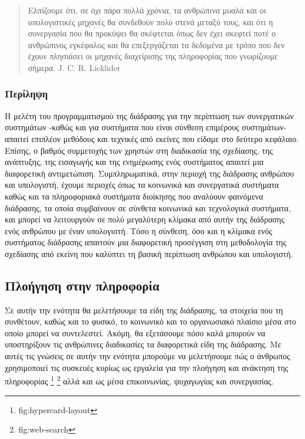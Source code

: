 \documentclass[
]{article}
\begin{document}
\begin{quote}
Ελπίζουμε ότι, σε όχι πάρα πολλά χρόνια, τα ανθρώπινα μυαλά και οι
υπολογιστικές μηχανές θα συνδεθούν πολύ στενά μεταξύ τους, και ότι η
συνεργασία που θα προκύψει θα σκέφτεται όπως δεν έχει σκεφτεί ποτέ ο
ανθρώπινος εγκέφαλος και θα επεξεργάζεται τα δεδομένα με τρόπο που δεν
έχουν πλησιάσει οι μηχανές διαχείρισης της πληροφορίας που γνωρίζουμε
σήμερα. J. C. R. Licklider
\end{quote}

\hypertarget{ux3c0ux3b5ux3c1ux3afux3bbux3b7ux3c8ux3b7}{%
\subsubsection{Περίληψη}\label{ux3c0ux3b5ux3c1ux3afux3bbux3b7ux3c8ux3b7}}

Η μελέτη του προγραμματισμού της διάδρασης για την περίπτωση των
συνεργατικών συστημάτων -καθώς και για συστήματα που είναι σύνθεση
επιμέρους συστημάτων- απαιτεί επιπλέον μεθόδους και τεχνικές από εκείνες
που είδαμε στο δεύτερο κεφάλαιο. Επίσης, ο βαθμός συμμετοχής των χρηστών
στη διαδικασία της σχεδίασης, της ανάπτυξης, της εισαγωγής και της
ενημέρωσης ενός συστήματος απαιτεί μια διαφορετική αντιμετώπιση.
Συμπληρωματικά, στην περιοχή της διάδρασης ανθρώπου και υπολογιστή,
έχουμε περιοχές όπως τα κοινωνικά και συνεργατικά συστήματα καθώς και τα
πληροφοριακά συστήματα διοίκησης που αναλύουν φαινόμενα διάδρασης, τα
οποία συμβαίνουν σε σύνθετα κοινωνικά και τεχνολογικά συστήματα, και
μπορεί να λειτουργούν σε πολύ μεγαλύτερη κλίμακα από αυτήν της διάδρασης
ενός ανθρώπου με έναν υπολογιστή. Τόσο η σύνθεση, όσο και η κλίμακα ενός
συστήματος διάδρασης απαιτούν μια διαφορετική προσέγγιση στη μεθοδολογία
της σχεδίασης από εκείνη που καλύπτει τη βασική περίπτωση ανθρώπου και
υπολογιστή.

\hypertarget{ux3c0ux3bbux3bfux3aeux3b3ux3b7ux3c3ux3b7-ux3c3ux3c4ux3b7ux3bd-ux3c0ux3bbux3b7ux3c1ux3bfux3c6ux3bfux3c1ux3afux3b1}{%
\subsection{Πλοήγηση στην
πληροφορία}\label{ux3c0ux3bbux3bfux3aeux3b3ux3b7ux3c3ux3b7-ux3c3ux3c4ux3b7ux3bd-ux3c0ux3bbux3b7ux3c1ux3bfux3c6ux3bfux3c1ux3afux3b1}}

Σε αυτήν την ενότητα θα μελετήσουμε τα είδη της διάδρασης, τα στοιχεία
που τη συνθέτουν, καθώς και το φυσικό, το κοινωνικό και το οργανωσιακό
πλαίσιο μέσα στο οποίο μπορεί να συντελεστεί. Ακόμη, θα εξετάσουμε πόσο
καλά μπορούν να υποστηρίξουν τις ανθρώπινες διαδικασίες τα διαφορετικά
είδη της διάδρασης. Με αυτές τις γνώσεις σε αυτήν την ενότητα μπορούμε
να μελετήσουμε πώς ο άνθρωπος χρησιμοποιεί τις συσκευές κυρίως ως
εργαλεία για την πλοήγηση και ανάκτηση της πληροφορίας \footnote{fig:hypercard-layout}
\footnote{fig:web-search} αλλά και ως μέσα επικοινωνίας, ψυχαγωγίας και
συνεργασίας.
\end{document}
